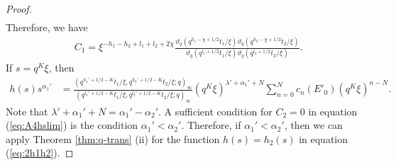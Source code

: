 \documentclass[12pt]{amsart}
\numberwithin{equation}{section}
\theoremstyle{definition}
\theoremstyle{remark}
\begin{document}
\begin{proof}
\begin{align*}
\end{align*}
Therefore, we have 
\begin{align}
 & C_{1} = \xi^{-h_{1} - h_{2} + l_{1} + l_{2} + 2\chi} \frac{\vartheta_q (q^{h_{1} - \chi + 1/2}t_{1}/\xi) \vartheta _q (q^{h_{2} - \chi + 1/2}t_{2}/\xi)}{\vartheta _q (q^{l_{1} + 1/2}t_{1}/\xi) \vartheta _q (q^{l_{2} + 1/2}t_{2}/\xi)} . \label{eq:2C1}
  \end{align}
If $s= q^{K}\xi$, then
  \begin{align*}
  h(s)s^{\alpha_{1}'} 
  &= \frac{(q^{h_{1}' + 1/2 - K}t_{1}/\xi, q^{h_{2}' + 1/2 - K}t_{2}/\xi; q)_\infty}{(q^{l_{1}' + 1/2 - K}t_{1}/\xi, q^{l_{2}' + 1/2 - K}t_{2}/\xi; q)_\infty} (q^{K}\xi)^{\lambda ' + \alpha_{1}' +N} \sum_{n = 0}^{N} c_{n}  (E'_0) (q^{K}\xi)^{n-N} .
  \end{align*}
Note that $\lambda ' + \alpha_{1}' +N = \alpha_{1}' -\alpha_{2}' $.
A sufficient condition for $C_2 =0$ in equation (\ref{eq:A4hslim}) is the condition $\alpha_{1}' < \alpha_{2}' $.
Therefore, if $ \alpha_{1}' < \alpha_{2}'$, then we can apply Theorem \ref{thm:q-trans} (ii) for the function $h(s) = h_2(s)$ in equation (\ref{eq:2h1h2}).


\end{proof}
\end{document}
